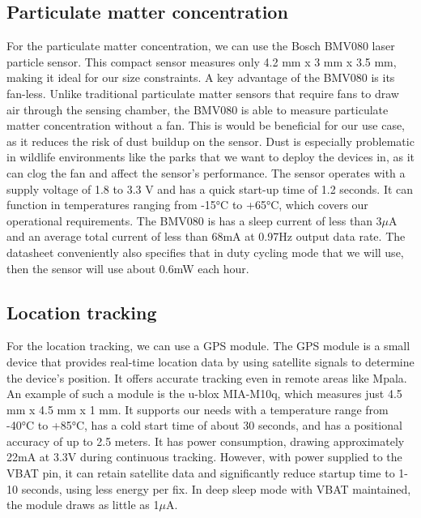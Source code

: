 \subsection{Particulate matter concentration}
For the particulate matter concentration, we can use the Bosch BMV080 laser particle sensor\cite{bmv080}. This compact sensor measures only 4.2 mm x 3 mm x 3.5 mm, making it ideal for our size constraints. A key advantage of the BMV080 is its fan-less. Unlike traditional particulate matter sensors that require fans to draw air through the sensing chamber, the BMV080 is able to measure particulate matter concentration without a fan. This is would be beneficial for our use case, as it reduces the risk of dust buildup on the sensor. Dust is especially problematic in wildlife environments like the parks that we want to deploy the devices in, as it can clog the fan and affect the sensor's performance. The sensor operates with a supply voltage of 1.8 to 3.3 V and has a quick start-up time of 1.2 seconds. It can function in temperatures ranging from -15°C to +65°C, which covers our operational requirements. The BMV080 is has a sleep current of less than 3$\mu$A and an average total current of less than 68mA at 0.97Hz output data rate.
The datasheet conveniently also specifies that in duty cycling mode that we will use, then the sensor will use about 0.6mW each hour. 


\subsection{Location tracking}
For the location tracking, we can use a GPS module. The GPS module is a small device that provides real-time location data by using satellite signals to determine the device's position. It offers accurate tracking even in remote areas like Mpala. An example of such a module is the u-blox MIA-M10q, which measures just 4.5 mm x 4.5 mm x 1 mm\cite{u_blox_mia_m10q}. It supports our needs with a temperature range from -40°C to +85°C, has a cold start time of about 30 seconds, and has a positional accuracy of up to 2.5 meters. It has power consumption, drawing approximately 22mA at 3.3V during continuous tracking. However, with power supplied to the VBAT pin, it can retain satellite data and significantly reduce startup time to 1-10 seconds, using less energy per fix. In deep sleep mode with VBAT maintained, the module draws as little as 1$\mu$A.


